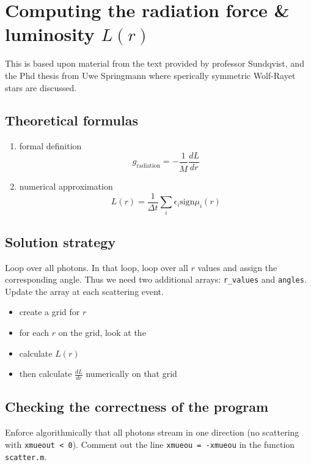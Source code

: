 \documentclass[../main/main.tex]{subfiles}
\begin{document}
\newpage
\section{Computing the radiation force \& luminosity $L(r)$}
\label{computing_radiation_force}

This is based upon material from the text provided by professor Sundqvist, and the Phd thesis from Uwe Springmann \cite{UweSpringmannPHD} where sperically symmetric Wolf-Rayet stars are discussed.

\subsection{Theoretical formulas}
\begin{enumerate}
\item formal definition
\begin{equation}
g_{\text{radiation}} = - \frac{1}{\dot{M}}\frac{dL}{dr}
\end{equation}
\item numerical approximation 
\begin{equation}
L(r) = \frac{1}{\Delta t} \sum_i \epsilon_i \text{sign}\mu_i(r)
\end{equation}
\end{enumerate}

\subsection{Solution strategy}
Loop over all photons. In that loop, loop over all $r$ values and assign the corresponding angle. Thus we need two additional arrays: \texttt{r\_values} and \texttt{angles}. Update the array at each scattering event.


\begin{itemize}
\item create a grid for $r$
\item for each $r$ on the grid, look at the 
\item calculate $L(r)$
\item then calculate $\frac{dL}{dr}$ numerically on that grid
\end{itemize}

\subsection{Checking the correctness of the program}
Enforce algorithmically that all photons stream in one direction (no scattering with \texttt{xmueout < 0}). Comment out the line \texttt{xmueou = -xmueou} in the function \texttt{scatter.m}.
\end{document}

